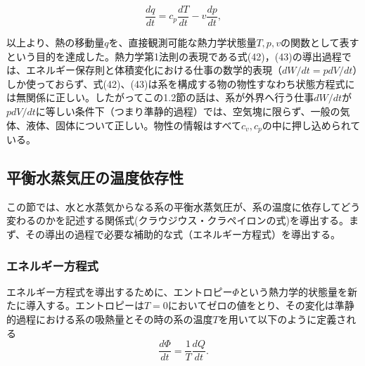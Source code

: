 \documentclass{jsarticle}
\begin{document}
\begin{equation}
 \frac{dq}{dt}=c_{p}\frac{dT}{dt}-v\frac{dp}{dt},
\end{equation}

以上より、熱の移動量$q$を、直接観測可能な熱力学状態量$T, p, v$の関数として表すという目的を達成した。熱力学第1法則の表現である式(42)，(43)の導出過程では、エネルギー保存則と体積変化における仕事の数学的表現（$dW/dt = pdV/dt$）しか使っておらず、式(42)、(43)は系を構成する物の物性すなわち状態方程式には無関係に正しい。したがってこの1.2節の話は、系が外界へ行う仕事$dW/dt$が$pdV/dt$に等しい条件下（つまり準静的過程）では、空気塊に限らず、一般の気体、液体、固体について正しい。物性の情報はすべて$c_{v}, c_{p}$の中に押し込められている。

\subsection{平衡水蒸気圧の温度依存性}
この節では、水と水蒸気からなる系の平衡水蒸気圧が、系の温度に依存してどう変わるのかを記述する関係式(クラウジウス・クラペイロンの式)を導出する。まず、その導出の過程で必要な補助的な式（エネルギー方程式）を導出する。
\subsubsection{エネルギー方程式}
エネルギー方程式を導出するために、エントロピー$\Phi$という熱力学的状態量を新たに導入する。エントロピーは$T=0$においてゼロの値をとり、その変化は準静的過程における系の吸熱量とその時の系の温度$T$を用いて以下のように定義される
\begin{equation}
 \frac{d\Phi}{dt}=\frac{1}{T}\frac{dQ}{dt}.
\end{equation}
\end{document}
